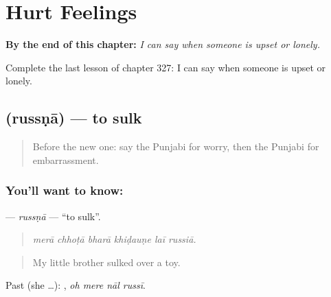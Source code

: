 
\chapter{Hurt Feelings}
\label{ch:pa-a2-hurt-feelings}

\begin{chapteropening}
\textbf{By the end of this chapter:} \emph{I can say when someone is upset or lonely.}

Complete the last lesson of chapter 327: I can say when someone is upset or lonely.
\end{chapteropening}

\section[\texorpdfstring{\pa{ਰੁੱਸਣਾ} (russṇā)}{ਰੁੱਸਣਾ (russṇā)}]{ (russṇā) — to sulk}

\label{lesson:PA-C327-russna}



\begin{quote}
Before the new one: say the Punjabi for worry, then the Punjabi for embarrassment.
\end{quote}

\subsection*{You'll want to know: }
\textbf{} — \emph{russṇā} — \textquotedblleft{}to sulk\textquotedblright{}.

\begin{quote}
     
\end{quote}

\begin{quote}
\emph{merā chhoṭā bharā khiḍauṇe laī russiā.}
\end{quote}

\begin{quote}
My little brother sulked over a toy.
\end{quote}

Past (she …):    , \emph{oh mere nāl russī}.

